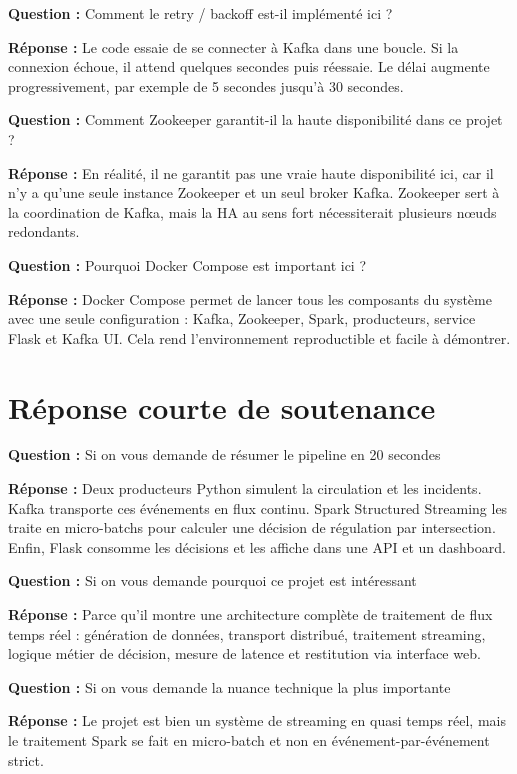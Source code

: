 \documentclass[11pt,a4paper]{article}
\newcommand{\question}[1]{
  \begin{questionbox}
  \textbf{Question :} #1
  \end{questionbox}
}
\newcommand{\reponse}{\textbf{Réponse : }}
\begin{document}
\question{Comment le retry / backoff est-il implémenté ici ?}
\reponse Le code essaie de se connecter à Kafka dans une boucle. Si la connexion échoue, il attend quelques secondes puis réessaie. Le délai augmente progressivement, par exemple de 5 secondes jusqu'à 30 secondes.

\question{Comment Zookeeper garantit-il la haute disponibilité dans ce projet ?}
\reponse En réalité, il ne garantit pas une vraie haute disponibilité ici, car il n'y a qu'une seule instance Zookeeper et un seul broker Kafka. Zookeeper sert à la coordination de Kafka, mais la HA au sens fort nécessiterait plusieurs nœuds redondants.

\question{Pourquoi Docker Compose est important ici ?}
\reponse Docker Compose permet de lancer tous les composants du système avec une seule configuration : Kafka, Zookeeper, Spark, producteurs, service Flask et Kafka UI. Cela rend l'environnement reproductible et facile à démontrer.

\section{Réponse courte de soutenance}

\question{Si on vous demande de résumer le pipeline en 20 secondes}
\reponse Deux producteurs Python simulent la circulation et les incidents. Kafka transporte ces événements en flux continu. Spark Structured Streaming les traite en micro-batchs pour calculer une décision de régulation par intersection. Enfin, Flask consomme les décisions et les affiche dans une API et un dashboard.

\question{Si on vous demande pourquoi ce projet est intéressant}
\reponse Parce qu'il montre une architecture complète de traitement de flux temps réel : génération de données, transport distribué, traitement streaming, logique métier de décision, mesure de latence et restitution via interface web.

\question{Si on vous demande la nuance technique la plus importante}
\reponse Le projet est bien un système de streaming en quasi temps réel, mais le traitement Spark se fait en micro-batch et non en événement-par-événement strict.
\end{document}
